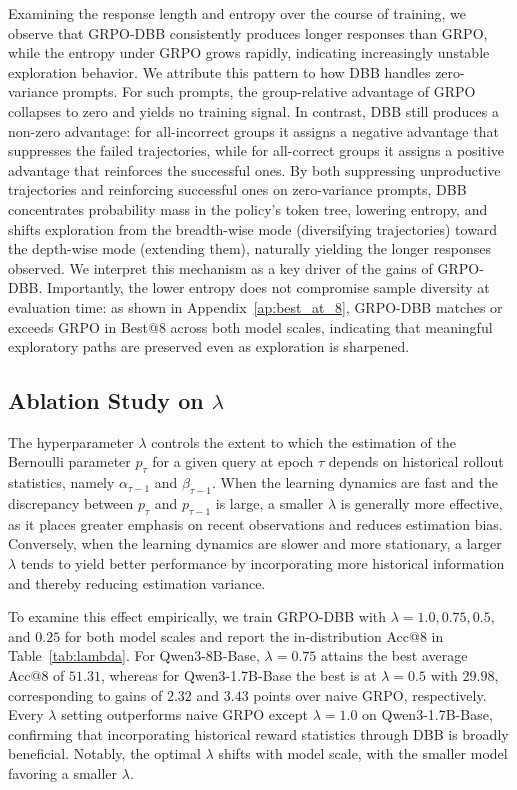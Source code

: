 Examining the response length and entropy over the course of training, we observe that GRPO-DBB consistently produces longer responses than GRPO, while the entropy under GRPO grows rapidly, indicating increasingly unstable exploration behavior.
We attribute this pattern to how DBB handles zero-variance prompts.
For such prompts, the group-relative advantage of GRPO collapses to zero and yields no training signal.
In contrast, DBB still produces a non-zero advantage: for all-incorrect groups it assigns a negative advantage that suppresses the failed trajectories, while for all-correct groups it assigns a positive advantage that reinforces the successful ones.
By both suppressing unproductive trajectories and reinforcing successful ones on zero-variance prompts, DBB concentrates probability mass in the policy's token tree, lowering entropy, and shifts exploration from the breadth-wise mode (diversifying trajectories) toward the depth-wise mode (extending them), naturally yielding the longer responses observed.
We interpret this mechanism as a key driver of the gains of GRPO-DBB.
Importantly, the lower entropy does not compromise sample diversity at evaluation time: as shown in Appendix~\ref{ap:best_at_8}, GRPO-DBB matches or exceeds GRPO in Best@8 across both model scales, indicating that meaningful exploratory paths are preserved even as exploration is sharpened.


\subsection{Ablation Study on $\lambda$}
\label{sec:impact_lambda}

The hyperparameter $\lambda$ controls the extent to which the estimation of the Bernoulli parameter $p_{\tau}$ for a given query at epoch $\tau$ depends on historical rollout statistics, namely $\alpha_{\tau-1}$ and $\beta_{\tau-1}$.
When the learning dynamics are fast and the discrepancy between $p_{\tau}$ and $p_{\tau-1}$ is large, a smaller $\lambda$ is generally more effective, as it places greater emphasis on recent observations and reduces estimation bias.
Conversely, when the learning dynamics are slower and more stationary, a larger $\lambda$ tends to yield better performance by incorporating more historical information and thereby reducing estimation variance.

To examine this effect empirically, we train GRPO-DBB with $\lambda = 1.0, 0.75, 0.5,$ and $0.25$ for both model scales and report the in-distribution Acc@8 in Table~\ref{tab:lambda}.
For Qwen3-8B-Base, $\lambda=0.75$ attains the best average Acc@8 of $51.31$, whereas for Qwen3-1.7B-Base the best is at $\lambda=0.5$ with $29.98$, corresponding to gains of $2.32$ and $3.43$ points over naive GRPO, respectively.
Every $\lambda$ setting outperforms naive GRPO except $\lambda=1.0$ on Qwen3-1.7B-Base, confirming that incorporating historical reward statistics through DBB is broadly beneficial.
Notably, the optimal $\lambda$ shifts with model scale, with the smaller model favoring a smaller $\lambda$.

